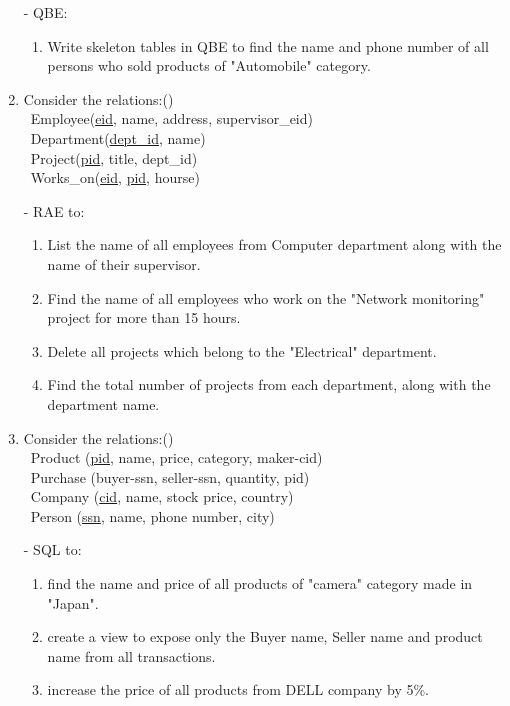 \documentclass[12pt]{article}
\newcommand{\enter}{\\\textcolor{white}{1}}
\begin{document}
\begin{enumerate}
        - QBE:
        \begin{enumerate}[noitemsep, topsep = 0pt, label = \alph*.]
            \item Write skeleton tables in QBE to find the name and phone number of all persons who sold products of "Automobile" category.
        \end{enumerate}

    \item Consider the relations:\hfill()
        \enter Employee(\underline{eid}, name, address, supervisor\_eid)
        \enter Department(\underline{dept\_id}, name)
        \enter Project(\underline{pid}, title, dept\_id)
        \enter Works\_on(\underline{eid}, \underline{pid}, hourse)

        - RAE to:
        \begin{enumerate}[noitemsep, topsep = 0pt, label = \alph*.]
            \item List the name of all employees from Computer department along with the name of their supervisor.
            \item Find the name of all employees who work on the "Network monitoring" project for more than 15 hours.
            \item Delete all projects which belong to the "Electrical" department.
            \item Find the total number of projects from each department, along with the department name.
        \end{enumerate}

    \item Consider the relations:\hfill()
        \enter Product (\underline{pid}, name, price, category, maker-cid)
        \enter Purchase (buyer-ssn, seller-ssn, quantity, pid)
        \enter Company (\underline{cid}, name, stock price, country)
        \enter Person (\underline{ssn}, name, phone number, city)

        - SQL to:
        \begin{enumerate}[noitemsep, topsep = 0pt, label = \alph*.]
            \item find the name and price of all products of "camera" category made in "Japan".
            \item create a view to expose only the Buyer name, Seller name and product name from all transactions.
            \item increase the price of all products from DELL company by 5\%.
        \end{enumerate}


\end{enumerate}
\end{document}
